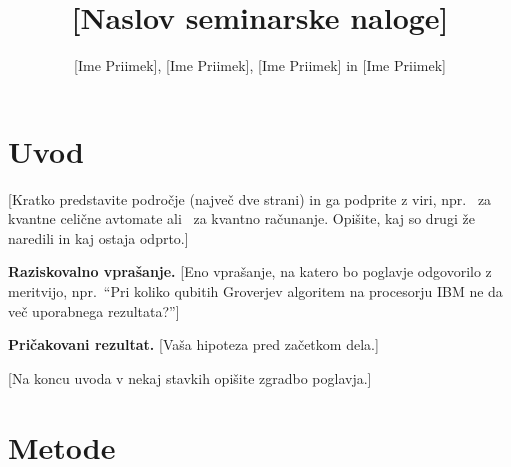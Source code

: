 %
%

\graphicspath{{Skupina01/img/}}

\title{[Naslov seminarske naloge]}
\author{[Ime Priimek], [Ime Priimek], [Ime Priimek] in [Ime Priimek]}
\maketitle



\section{Uvod}
\label{g01:sec:uvod}

[Kratko predstavite področje (največ dve strani) in ga podprite z viri, npr.~\cite{lent1997} za kvantne celične avtomate ali~\cite{nielsen2010} za kvantno računanje. Opišite, kaj so drugi že naredili in kaj ostaja odprto.]

\begin{svgraybox}
\textbf{Raziskovalno vprašanje.} [Eno vprašanje, na katero bo poglavje odgovorilo z meritvijo, npr.\ \enquote{Pri koliko qubitih Groverjev algoritem na procesorju IBM ne da več uporabnega rezultata?}]

\textbf{Pričakovani rezultat.} [Vaša hipoteza pred začetkom dela.]
\end{svgraybox}

[Na koncu uvoda v nekaj stavkih opišite zgradbo poglavja.]


\section{Metode}
\label{g01:sec:metode}

